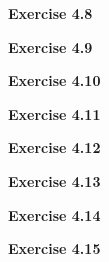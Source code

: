 \documentclass{article}
\begin{document}
\bigskip

\begin{framed}
    \noindent \textbf{Exercise 4.8}
    
    \medskip
    
    
\end{framed}


\bigskip

\begin{framed}
    \noindent \textbf{Exercise 4.9}
    
    \medskip
    
    
\end{framed}


\bigskip

\begin{framed}
    \noindent \textbf{Exercise 4.10}
    
    \medskip
    
    
\end{framed}


\bigskip

\begin{framed}
    \noindent \textbf{Exercise 4.11}
    
    \medskip
    
    
\end{framed}


\bigskip

\begin{framed}
    \noindent \textbf{Exercise 4.12}
    
    \medskip
    
    
\end{framed}


\bigskip

\begin{framed}
    \noindent \textbf{Exercise 4.13}
    
    \medskip
    
    
\end{framed}


\bigskip

\begin{framed}
    \noindent \textbf{Exercise 4.14}
    
    \medskip
    
    
\end{framed}


\bigskip

\begin{framed}
    \noindent \textbf{Exercise 4.15}
    
    \medskip
    
    
\end{framed}
\end{document}
